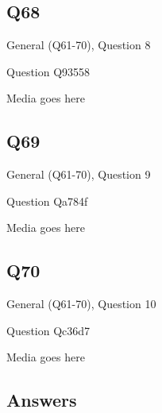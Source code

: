 \documentclass[11pt]{beamer}
\begin{document}
\subsection*{Q68}
\begin{frame}[t]{General (Q61-70), Question 8}
\vspace{2em}
\begin{block}{Question}
Q93558
\end{block}
\begin{center}
Media goes here
\end{center}
\end{frame}
    

\subsection*{Q69}
\begin{frame}[t]{General (Q61-70), Question 9}
\vspace{2em}
\begin{block}{Question}
Qa784f
\end{block}
\begin{center}
Media goes here
\end{center}
\end{frame}
    

\subsection*{Q70}
\begin{frame}[t]{General (Q61-70), Question 10}
\vspace{2em}
\begin{block}{Question}
Qc36d7
\end{block}
\begin{center}
Media goes here
\end{center}
\end{frame}
    
\subsection{Answers}
\end{document}
